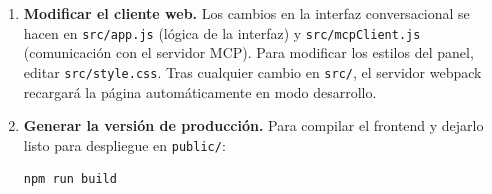 \begin{enumerate}
  \item \textbf{Modificar el cliente web.}
  Los cambios en la interfaz conversacional se hacen en \texttt{src/app.js} (lógica de la interfaz) y \texttt{src/mcpClient.js} (comunicación con el servidor MCP). Para modificar los estilos del panel, editar \texttt{src/style.css}. Tras cualquier cambio en \texttt{src/}, el servidor webpack recargará la página automáticamente en modo desarrollo.

  \item \textbf{Generar la versión de producción.}
  Para compilar el frontend y dejarlo listo para despliegue en \texttt{public/}:
  \begin{lstlisting}[style=promptbox]
npm run build
  \end{lstlisting}

\end{enumerate}

